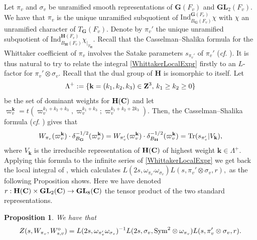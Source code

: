 \documentclass[11pt, reqno]{amsart}
\theoremstyle{plain}
\newtheorem{prop}[theorem]{Proposition}
\theoremstyle{definition}
\theoremstyle{remark}
\theoremstyle{plain}
\def\Z{{\bf Z}}
\def\C{{\bf C}}
\def\H{{H}}
\def\G{\mathbf{G}}
\def\H{\mathbf{H}}
\def\GL{\mathbf{GL}}
\begin{document}
Let $\pi_v$ and $\sigma_v$ be unramified smooth representations of $\G(F_v)$ and $\GL_2(F_v)$. We have that $\pi_v$ is the unique unramified subquotient of $\mathrm{Ind}_{B_{\G}(F_v)}^{\G(F_v)}\chi$ with $\chi$ an unramified character of $T_{\G}(F_v)$. Denote by $\pi_v'$ the unique unramified subquotient of $\mathrm{Ind}_{B_{\H}(F_v)}^{\H(F_v)}\chi_{|_{T_{\H}}}$. Recall that the Casselman--Shalika formula for the Whittaker coefficient of $\pi_v$ involves the Satake parameters $s_{\pi_v'}$ of $\pi_v'$  (\textit{cf}. \cite[Proposition 5.2.1]{GanHundley}). It is thus natural to try to relate the integral \eqref{WhittakerLocalExpr} firstly to an $L$-factor for $\pi_v' \otimes \sigma_v$. Recall that the dual group of $\H$ is isomorphic to itself. Let \[\Lambda^+:= \{ \mathbf{k} = (k_1,k_2,k_3) \in \Z^3,\, k_1 \geq k_2 \geq 0 \}\] be the set of dominant weights for $\H(\C)$ and let $\varpi_v^\mathbf{k} = t(\varpi_v^{k_1+k_2+k_3},\varpi_v^{k_1+k_3};\varpi_v^{k_1+k_2+2k_3})$. Then, the Casselman--Shalika formula (\textit{cf}. \cite[(3.9)]{FurusawaMorimoto}) gives that \begin{align}\label{eq_ref_CS_GU_inert}
     W_{\pi_v}(\varpi_v^\mathbf{k}) \cdot \delta_{B_\G}^{-1/2}(\varpi_v^\mathbf{k}) = W_{\pi_v'}(\varpi_v^\mathbf{k}) \cdot \delta_{B_\H}^{-1/2}(\varpi_v^\mathbf{k}) = {\rm Tr}(s_{\pi_v'}| V_\mathbf{k}),
\end{align}  
where $V_\mathbf{k}$ is the irreducible representation of $\H(\C)$ of highest weight $\mathbf{k} \in \Lambda^+$. Applying this formula to the infinite series of \eqref{WhittakerLocalExpr} we get back the local integral of \cite{Novodvorsky}, which calculates $L(2s,\omega_{\pi_v'}\omega_{\sigma_v})L(s,\pi_v' \otimes \sigma_v, r),$  as the following Proposition shows. Here we have denoted $r: \H(\C) \times \GL_2(\C) \to \GL_8(\C)$ the tensor product of the two standard representations.


\begin{prop}\label{theononsplit1}
 We have that \[Z(s,W_{\pi_v},W_{s,v}^{\rm o}) = L(2s,\omega_{\pi_v'}\omega_{\sigma_v})^{-1} L(2s,\sigma_v,{\rm Sym}^2 \otimes \omega_{\pi_v}) L(s,\pi_v' \otimes \sigma_v, r). \]   
\end{prop}
\end{document}

